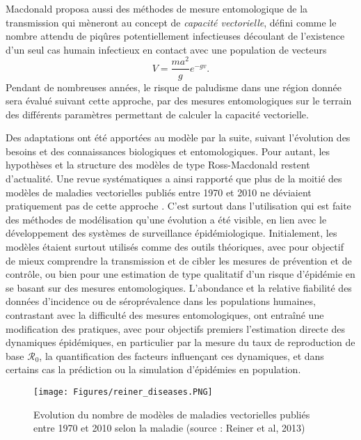 Macdonald proposa aussi des méthodes de mesure entomologique de la transmission qui mèneront au concept de {\em capacité vectorielle}, défini comme le nombre attendu de piqûres potentiellement infectieuses découlant de l'existence d'un seul cas humain infectieux en contact avec une population de vecteurs 
\begin{equation}
V = \frac{ma^2}{g}e^{-gv}.
\end{equation}
Pendant de nombreuses années, le risque de paludisme dans une région donnée sera évalué suivant cette approche, par des mesures entomologiques sur le terrain des différents paramètres permettant de calculer la capacité vectorielle.

Des adaptations ont été apportées au modèle par la suite, suivant l'évolution des besoins et des connaissances biologiques et entomologiques.
Pour autant, les hypothèses et la structure des modèles de type Ross-Macdonald restent d'actualité. 
Une revue systématiques a ainsi rapporté que plus de la moitié des modèles de maladies vectorielles publiés entre 1970 et 2010 ne déviaient pratiquement pas de cette approche \cite{reiner_systematic_2013}.
C'est surtout dans l'utilisation qui est faite des méthodes de modélisation qu'une évolution a été visible, en lien avec le développement des systèmes de surveillance épidémiologique.
Initialement, les modèles étaient surtout utilisés comme des outils théoriques, avec pour objectif de mieux comprendre la transmission et de cibler les mesures de prévention et de contrôle, ou bien pour une estimation de type qualitatif d'un risque d'épidémie en se basant sur des mesures entomologiques.
L'abondance et la relative fiabilité des données d'incidence ou de séroprévalence dans les populations humaines, contrastant avec la difficulté des mesures entomologiques, ont entraîné une modification des pratiques, avec pour objectifs premiers l'estimation directe des dynamiques épidémiques, en particulier par la mesure du taux de reproduction de base $\mathcal{R}_0$, la quantification des facteurs influençant ces dynamiques, et dans certains cas la prédiction ou la simulation d'épidémies en population.

\begin{figure}[t]
	\centering
	\texttt{[image: Figures/reiner\_diseases.PNG]}
	\caption{Evolution du nombre de modèles de maladies vectorielles publiés entre 1970 et 2010 selon la maladie (source : Reiner et al, 2013)}
	\label{fig:reiner_diseases}
\end{figure}


